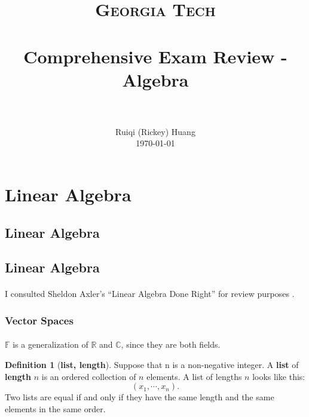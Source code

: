 \documentclass[paper=a4, fontsize=11pt]{scrartcl}
\title{
		\usefont{OT1}{bch}{b}{n}
		\normalfont \normalsize \textsc{Georgia Tech} \\ [25pt]
		\horrule{0.5pt} \\[0.4cm]
		\huge Comprehensive Exam Review - Algebra \\
		\horrule{2pt} \\[0.5cm]
}
\author{
		\normalfont 								\normalsize
        Ruiqi (Rickey) Huang                 \\\normalsize
        \today
}
\date{}
\numberwithin{equation}{section}		%
\numberwithin{figure}{section}			%
\numberwithin{table}{section}				%
\newcommand{\RNum}[1]{\uppercase\expandafter{\romannumeral #1\relax}}
\theoremstyle{definition}
\newtheorem{definition}{Definition}[section]
\theoremstyle{remark}
\theoremstyle{example}
\begin{document}
\maketitle
\thispagestyle{empty}

\newpage

\tableofcontents
\thispagestyle{empty}

\newpage

\section{Linear Algebra}

\subsection{Linear Algebra \RNum{1}}

\subsection{Linear Algebra \RNum{2}}

\paragraph{}

I consulted Sheldon Axler's ``Linear Algebra Done Right'' for review purposes \cite{axler_linear_2015}.

\subsubsection{Vector Spaces}

\paragraph{}

$\mathbb{F}$ is a generalization of $\mathbb{R}$ and $\mathbb{C}$, since they are both fields.

\begin{definition}[\textbf{list, length}]
    Suppose that n is a non-negative integer. A \textbf{list} of \textbf{length} $n$ is an ordered collection of $n$ elements. A list of lengths $n$ looks like this:
    \begin{equation}
        (x_1, \cdots, x_n).
    \end{equation}
    Two lists are equal if and only if they have the same length and the same elements in the same order.
\end{definition}
\end{document}
